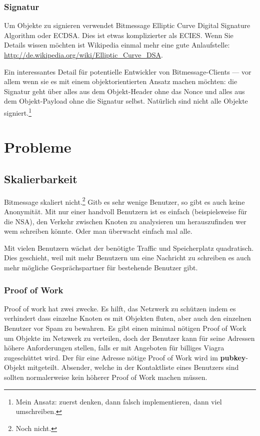 \documentclass{bfh}
\newcommand{\obj}[1]{\textbf{\textcolor{OliveGreen}{#1}}}
\begin{document}
  \subsubsection{Signatur}

  Um Objekte zu signieren verwendet Bitmessage Elliptic Curve Digital Signature Algorithm oder ECDSA. Dies ist etwas komplizierter als ECIES. Wenn Sie Details wissen möchten ist Wikipedia einmal mehr eine gute Anlaufstelle: \url{http://de.wikipedia.org/wiki/Elliptic_Curve_DSA}.

  Ein interessantes Detail für potentielle Entwickler von Bitmessage-Clients --- vor allem wenn sie es mit einem objektorientierten Ansatz machen möchten: die Signatur geht über alles aus dem Objekt-Header ohne das Nonce und alles aus dem Objekt-Payload ohne die Signatur selbst. Natürlich sind nicht alle Objekte signiert.\footnote{Mein Ansatz: zuerst denken, dann falsch implementieren, dann viel umschreiben.}

  \newpage
  \section{Probleme}

  \subsection{Skalierbarkeit}

  Bitmessage skaliert nicht.\footnote{Noch nicht.} Gitb es sehr wenige Benutzer, so gibt es auch keine Anonymität. Mit nur einer handvoll Benutzern ist es einfach (beispielsweise für die NSA), den Verkehr zwischen Knoten zu analysieren um herauszufinden wer wem schreiben könnte. Oder man überwacht einfach mal alle.

  Mit vielen Benutzern wächst der benötigte Traffic und Speicherplatz quadratisch. Dies geschieht, weil mit mehr Benutzern um eine Nachricht zu schreiben es auch mehr mögliche Gesprächspartner für bestehende Benutzer gibt.

  \subsubsection{Proof of Work}
  Proof of work hat zwei zwecke. Es hilft, das Netzwerk zu schützen indem es verhindert dass einzelne Knoten es mit Objekten fluten, aber auch den einzelnen Benutzer vor Spam zu bewahren. Es gibt einen minimal nötigen Proof of Work um Objekte im Netzwerk zu verteilen, doch der Benutzer kann für seine Adressen höhere Anforderungen stellen, falls er mit Angeboten für billiges Viagra\texttrademark{} zugeschüttet wird. Der für eine Adresse nötige Proof of Work wird im \obj{pubkey}-Objekt mitgeteilt. Absender, welche in der Kontaktliste eines Benutzers sind sollten normalerweise kein höherer Proof of Work machen müssen.
\end{document}
